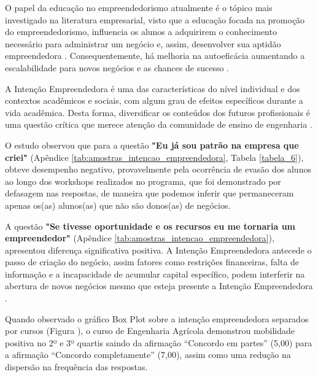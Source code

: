 O papel da educação no empreendedorismo atualmente é o tópico mais investigado na literatura empresarial, visto  que a educação focada na promoção do empreendedorismo, influencia os alunos a adquirirem o conhecimento necessário para administrar um negócio e, assim,  desenvolver sua aptidão empreendedora \cite{nowinski_impact_2019}. Consequentemente, há melhoria na autoeficácia \cite{egerova_does_2017} aumentando a escalabilidade para novos negócios e as chances de sucesso \cite{kolstad_education_2015}.

A Intenção Empreendedora é uma das características do nível individual e dos contextos acadêmicos e sociais, com algum grau de efeitos específicos durante a vida acadêmica. Desta forma, diversificar os conteúdos dos futuros profissionais é uma questão crítica que merece atenção da comunidade de ensino de engenharia \cite{gilmartin_entrepreneurial_2019}.

O estudo observou que para a questão \textbf{"Eu já sou patrão na empresa que criei"} (Apêndice \ref{tab:amostras_intencao_empreendedora}, Tabela \ref{tabela_6}), obteve desempenho negativo, provavelmente pela ocorrência de evasão dos alunos ao longo dos workshops realizados no programa, que foi demonstrado por defasagem nas respostas, de maneira que podemos inferir que permaneceram apenas os(as) alunos(as) que não são donos(as) de negócios. 


A questão \textbf{"Se tivesse oportunidade e os recursos eu me tornaria um empreendedor"} (Apêndice \ref{tab:amostras_intencao_empreendedora}), apresentou diferença significativa positiva. A Intenção Empreendedora antecede o passo de criação do negócio, assim fatores como restrições financeiras, falta de informação e a incapacidade de acumular capital específico, podem interferir na abertura de novos negócios mesmo que esteja presente a Intenção Empreendedora \cite{auguste_what_2016}.


Quando observado o gráfico Box Plot sobre a intenção empreendedora separados por cursos (Figura \cite{figura_boxplot_intencao}), o curso de Engenharia Agrícola demonstrou mobilidade positiva no 2º e 3º quartis saindo da afirmação “Concordo em partes” (5,00) para a afirmação “Concordo completamente” (7,00), assim como uma redução na dispersão na frequência das respostas.  




